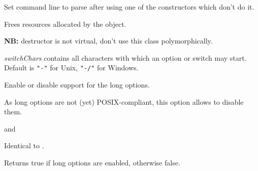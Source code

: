 \label{wxcmdlineparsersetcmdlinestr}


Set command line to parse after using one of the constructors which don't do it.




\label{wxcmdlineparserdtor}


Frees resources allocated by the object.

{\bf NB:} destructor is not virtual, don't use this class polymorphically.


\label{wxcmdlineparsersetswitchchars}


{\it switchChars} contains all characters with which an option or switch may
start. Default is {\tt "-"} for Unix, {\tt "-/"} for Windows.


\label{wxcmdlineparserenablelongoptions}


Enable or disable support for the long options.

As long options are not (yet) POSIX-compliant, this option allows to disable
them.


 and 


\label{wxcmdlineparserdisablelongoptions}


Identical to .


\label{wxcmdlineparserarelongoptionsenabled}


Returns true if long options are enabled, otherwise false.

